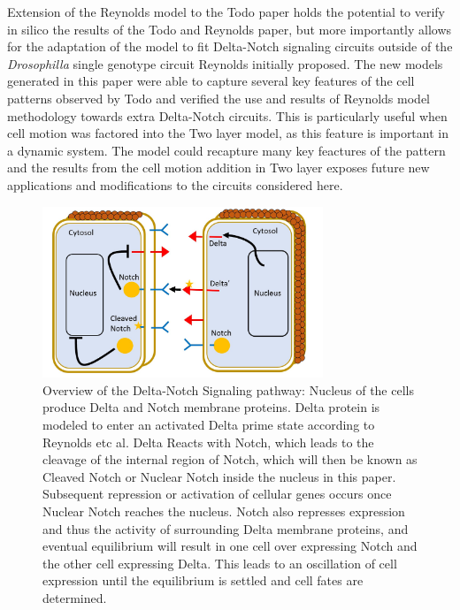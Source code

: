 \documentclass[12pt]{ifacconf}
\begin{document}
Extension of the Reynolds model to the Todo paper holds the potential to verify in silico the results of the Todo and Reynolds paper, but more importantly allows for the adaptation of the model to fit Delta-Notch signaling circuits outside of the \emph{Drosophilla} single genotype circuit Reynolds initially proposed. The new models generated in this paper were able to capture several key features of the cell patterns observed by Todo and verified the use and results of Reynolds model methodology towards extra Delta-Notch circuits. This is particularly useful when cell motion was factored into the Two layer model, as this feature is important in a dynamic system. The model could recapture many key feactures of the pattern and the results from the cell motion addition in Two layer exposes future new applications and modifications to the circuits considered here.

\begin{figure}
\begin{center}
\includegraphics[width=8.4cm]{Overview_of_Delta_Notch}    %
\caption{Overview of the Delta-Notch Signaling pathway: Nucleus of the cells produce Delta and Notch membrane proteins. Delta protein is modeled to enter an activated Delta prime state according to Reynolds etc al. Delta Reacts with Notch, which leads to the cleavage of the internal region of Notch, which will then be known as Cleaved Notch or Nuclear Notch inside the nucleus in this paper. Subsequent repression or activation of cellular genes occurs once Nuclear Notch reaches the nucleus. Notch also represses expression and thus the activity of surrounding Delta membrane proteins, and eventual equilibrium will result in one cell over expressing Notch and the other cell expressing Delta. This leads to an oscillation of cell expression until the equilibrium is settled and cell fates are determined. } 
\label{fig:bifurcation}
\end{center}
\end{figure}
\end{document}
